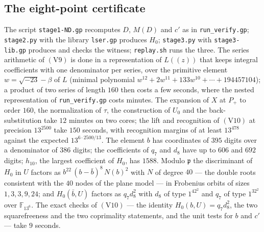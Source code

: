 \documentclass[11pt]{amsart}
\newcommand{\FF}{\mathbb{F}}
\newcommand{\sqm}{\sqrt{-23}}
\newcommand{\pp}{\mathfrak p}
\theoremstyle{plain}
\theoremstyle{definition}
\begin{document}
\subsection*{The eight-point certificate}
The script \texttt{stage1-ND.gp} recomputes $D$, $M(D)$ and $c'$ as in
\texttt{run\_verify.gp}; \texttt{stage2.py} with the library
\texttt{lser.gp} produces $H_0$; \texttt{stage3.py} with
\texttt{stage3-lib.gp} produces and checks the witness; \texttt{replay.sh}
runs the three. The series arithmetic of $(\mathrm V9)$ is done in a representation of
$L((z))$ that keeps integral coefficients with one denominator per
series, over the primitive element $w=\sqm-\beta$ of $L$ (minimal
polynomial $w^{12}+2w^{11}+133w^{10}+\cdots+194457104$); a product of
two series of length $160$ then costs a few seconds, where the nested
representation of \texttt{run\_verify.gp} costs minutes. The expansion
of $X$ at $P_+$ to order $160$, the normalization of $\tau$, the
construction of $U_0$ and the back-substitution take $12$ minutes on
two cores; the lift and recognition of $(\mathrm V10)$ at precision
$13^{2500}$ take $150$ seconds, with recognition margins of at least
$13^{478}$ against the expected $13^{6\cdot2500/13}$. The element $b$
has coordinates of $395$ digits over a denominator of $386$ digits;
the coefficients of $q_7$ and $d_8$ have up to $606$ and $692$ digits;
$h_{10}$, the largest coefficient of $H_0$, has $1588$. Modulo $\pp$
the discriminant of $H_0$ in $U$ factors as $b^{22}\,(b-\bar
b)^8\,N(b)^2$ with $N$ of degree $40$ --- the double roots consistent with the
$40$ nodes of the plane model --- in Frobenius orbits of sizes
$1,3,3,9,24$; and
$H_0(\bar b,U)$ factors as $q_7d_8^2$ with $d_8$ of type $1^42^2$ and
$q_7$ of type $1^32^2$ over $\FF_{13^6}$. The exact checks of
$(\mathrm V10)$ --- the identity $H_0(b,U)=q_7d_8^2$, the two
squarefreeness and the two coprimality statements, and the unit tests
for $b$ and $c'$ --- take $9$ seconds.
\fi
\end{document}
